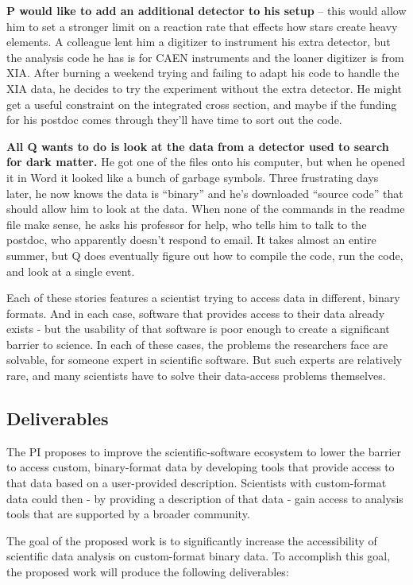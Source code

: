 \textbf{P would like to add an additional detector to his setup} -- this would allow him to set a stronger limit on a reaction rate that effects how stars create heavy elements.  A colleague lent him a digitizer to instrument his extra detector, but the analysis code he has is for CAEN instruments and the loaner digitizer is from XIA.  After burning a weekend trying and failing to adapt his code to handle the XIA data, he decides to try the experiment without the extra detector.  He might get a useful constraint on the integrated cross section, and maybe if the funding for his postdoc comes through they'll have time to sort out the code.
 
\textbf{All Q wants to do is look at the data from a detector used to search for dark matter.}  He got one of the files onto his computer, but when he opened it in Word it looked like a bunch of garbage symbols.  Three frustrating days later, he now knows the data is ``binary'' and he's downloaded ``source code''  
that should allow him to look at the data.  When none of the commands in the readme file make sense, he asks his professor for help, who tells him to talk to the postdoc, who apparently doesn't respond to email.  It takes almost an entire summer, but Q does eventually figure out how to compile the code, run the code, and look at a single event.   

Each of these stories features a scientist trying to access data in different, binary formats.  And in each case, software that provides access to their data already exists - but the usability of that software is poor enough to create a significant barrier to science.  In each of these cases, the problems the researchers face are solvable, for someone expert in scientific software.  But such experts are relatively rare, and many scientists have to solve their data-access problems themselves.

\subsection{Deliverables}
The PI proposes to improve the scientific-software ecosystem to lower the barrier to access custom, binary-format data by developing tools that provide access to that data based on a user-provided description.  Scientists with custom-format data could then - by providing a description of that data - gain access to analysis tools that are supported by a broader community.  

The goal of the proposed work is to significantly increase the accessibility of scientific data analysis on custom-format binary data.  To accomplish this goal, the proposed work will produce the following deliverables:

